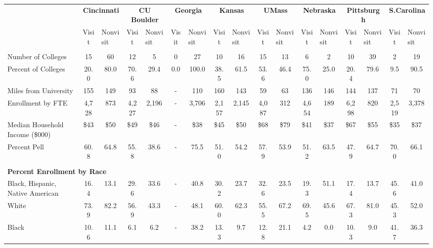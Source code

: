\begin{tabular*}{\linewidth}{@{\extracolsep{\fill} } lcccccccccccccccc}%
&\multicolumn{2}{c}{\bfseries Cincinnati}&\multicolumn{2}{c}{\bfseries CU Boulder}&\multicolumn{2}{c}{\bfseries Georgia}&\multicolumn{2}{c}{\bfseries Kansas}&\multicolumn{2}{c}{\bfseries UMass}&\multicolumn{2}{c}{\bfseries Nebraska}&\multicolumn{2}{c}{\bfseries Pittsburgh}&\multicolumn{2}{c}{\bfseries S.Carolina}\\%
&Visit&\multicolumn{1}{l}{Nonvisit}&Visit&\multicolumn{1}{l}{Nonvisit}&Visit&\multicolumn{1}{l}{Nonvisit}&Visit&\multicolumn{1}{l}{Nonvisit}&Visit&\multicolumn{1}{l}{Nonvisit}&Visit&\multicolumn{1}{l}{Nonvisit}&Visit&\multicolumn{1}{l}{Nonvisit}&Visit&\multicolumn{1}{l}{Nonvisit}\\%
\hline%
&&&&&&&&&&&&&&&&\\%
\hspace{0cm}Number of Colleges&15&60&12&5&0&27&10&16&15&13&6&2&10&39&2&19\\%
Percent of Colleges&20.0&80.0&70.6&29.4&0.0&100.0&38.5&61.5&53.6&46.4&75.0&25.0&20.4&79.6&9.5&90.5\\%
\hspace{0cm}Miles from University&155&149&93&88&{-}&110&160&143&59&63&136&146&144&137&71&70\\%
\hspace{0cm}Enrollment by FTE&4,728&873&4,227&2,196&{-}&3,706&2,157&2,145&4,087&312&4,654&189&6,298&820&2,519&3,378\\%
\hspace{0cm}Median Household Income (\$000)&\$43&\$50&\$49&\$46&{-}&\$38&\$45&\$50&\$68&\$79&\$41&\$37&\$67&\$55&\$35&\$37\\%
\hspace{0cm}Percent Pell&60.8&64.8&55.8&38.6&{-}&75.5&51.0&54.2&57.9&53.9&51.2&63.5&47.9&64.7&70.0&66.1\\%
&&&&&&&&&&&&&&&&\\%
\multicolumn{17}{l}{\bfseries Percent Enrollment by Race}\\%
\hspace{0.2cm}Black, Hispanic, Native American&16.4&13.1&29.6&33.6&{-}&40.8&30.2&23.7&32.6&23.5&19.3&51.1&17.4&13.7&45.6&41.0\\%
\hspace{0.2cm}White&73.9&82.2&56.9&43.3&{-}&48.1&60.0&62.3&55.5&67.2&69.5&45.6&67.3&81.0&45.3&52.0\\%
\hspace{0.2cm}Black&10.6&11.1&6.1&6.2&{-}&38.2&13.3&9.7&12.8&21.1&4.2&0.0&10.3&9.0&41.7&36.3\\%

\end{tabular*}
